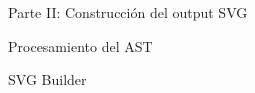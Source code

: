 \begin{section}{Parte II: Construcci\'on del output SVG}
\begin{subsection}{Procesamiento del AST}
\begin{itemize}
\end{itemize}

\end{subsection}

\begin{subsection}{SVG Builder}



\end{subsection}

\end{section}

